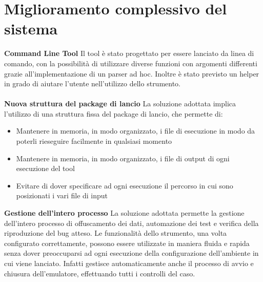 \section{Miglioramento complessivo del sistema}
\textbf{Command Line Tool} \newline
Il tool è stato progettato per essere lanciato da linea di comando, con la possibilità di utilizzare diverse funzioni con argomenti differenti grazie all'implementazione di un parser ad hoc. Inoltre è stato previsto un helper in grado di aiutare l'utente nell'utilizzo dello strumento.
\\\\
\noindent\textbf{Nuova struttura del package di lancio} \newline
La soluzione adottata implica l'utilizzo di una struttura fissa del package di lancio, che permette di:
\begin{itemize} [nosep]
\item Mantenere in memoria, in modo organizzato, i file di esecuzione in modo da poterli rieseguire facilmente in qualsiasi momento
\item Mantenere in memoria, in modo organizzato, i file di output di ogni esecuzione del tool
\item Evitare di dover specificare ad ogni esecuzione il percorso in cui sono posizionati i vari file di input
\end{itemize}
\bigskip
\noindent\textbf{Gestione dell'intero processo} \newline
La soluzione adottata permette la gestione dell'intero processo di offuscamento dei dati, automazione dei test e verifica della riproduzione del bug atteso. Le funzionalità dello strumento, una volta configurato correttamente, possono essere utilizzate in maniera fluida e rapida senza dover preoccuparsi ad ogni esecuzione della configurazione dell'ambiente in cui viene lanciato. Infatti gestisce automaticamente anche il processo di avvio e chiusura dell'emulatore, effettuando tutti i controlli del caso.


